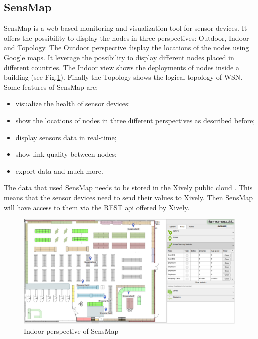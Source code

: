 \subsection{SensMap}

SensMap \cite{mraz2014visualization} is a web-based monitoring and visualization tool for sensor devices. It offers the possibility to display the nodes in three perspectives: Outdoor, Indoor and Topology. The Outdoor perspective display the locations of the nodes using Google maps. It leverage the possibility to display different nodes placed in different countries. The Indoor view shows the deployments of nodes inside a building (see Fig.\ref{fig:sensmap}). Finally the Topology shows the logical topology of WSN.\\

Some features of SensMap are:

\begin{itemize}
  \item visualize the health of sensor devices;
  \item show the locations of nodes in three different perspectives as described before;
  \item display sensors data in real-time;
  \item show link quality between nodes;
  \item export data and much more.
\end{itemize}

The data that used SensMap needs to be stored in the Xively public cloud \cite{website:xively}. This means that the sensor devices need to send their values to Xively. Then SensMap will have access to them via the REST api offered by Xively.

\begin{figure}
  \centering
  \includegraphics[width=\textwidth]{res/sensmap.jpg}
  \caption{Indoor perspective of SensMap}
  \label{fig:sensmap}
\end{figure}

